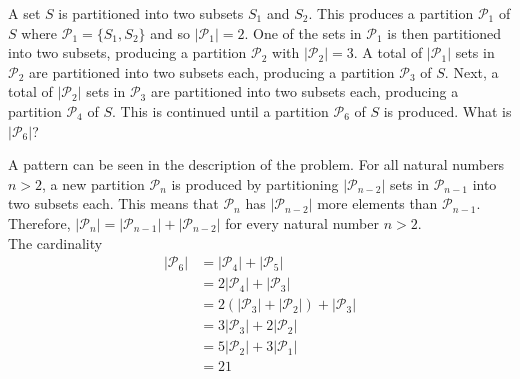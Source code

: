 \documentclass[12pt]{article}
\newenvironment{problem}[2][Problem]{\begin{trivlist}
		\item[\hskip \labelsep {\bfseries #1}\hskip \labelsep {\bfseries #2.}]}{\end{trivlist}}
\newenvironment{solution}[2][Solution]{\begin{trivlist}
		\item[\hskip \labelsep {\bfseries #1}\hskip \labelsep {\bfseries #2.}]}{\end{trivlist}}
\begin{document}
\begin{problem}{55}
	A set $S$ is partitioned into two subsets $S_{1}$ and $S_{2}$. This produces a partition $\mathcal{P}_{1}$ of $S$ where $\mathcal{P}_{1} = \{S_{1},S_{2}\}$ and so $|\mathcal{P}_{1}| = 2$. One of the sets in $\mathcal{P}_{1}$ is then partitioned into two subsets, producing a partition $\mathcal{P}_{2}$ with $|\mathcal{P}_{2}|=3$. A total of $|\mathcal{P}_{1}|$ sets in $\mathcal{P}_{2}$ are partitioned into two subsets each, producing a partition $\mathcal{P}_{3}$ of $S$. Next, a total of $|\mathcal{P}_{2}|$ sets in $\mathcal{P}_{3}$ are partitioned into two subsets each, producing a partition $\mathcal{P}_{4}$ of $S$. This is continued until a partition $\mathcal{P}_{6}$ of $S$ is produced. What is $|\mathcal{P}_{6}|$?
	\begin{solution}{}
		A pattern can be seen in the description of the problem.  For all natural numbers $n>2$, a new partition $\mathcal{P}_{n}$ is produced by partitioning $|\mathcal{P}_{n-2}|$ sets in $\mathcal{P}_{n-1}$ into two subsets each. This means that $\mathcal{P}_{n}$ has $|\mathcal{P}_{n-2}|$ more elements than $\mathcal{P}_{n-1}$.
		Therefore,  $|\mathcal{P}_{n}| = |\mathcal{P}_{n-1}|+ |\mathcal{P}_{n-2}|$ for every natural number $n>2$.\\
		The cardinality 
		\begin{align*}
		| \mathcal{P}_{6}|&= |\mathcal{P}_{4}| + |\mathcal{P}_{5}|\\
		&= 2|\mathcal{P}_{4}| + |\mathcal{P}_{3}|\\
		&= 2(|\mathcal{P}_{3}|+|\mathcal{P}_{2}|) + |\mathcal{P}_{3}|\\
		&= 3|\mathcal{P}_{3}| + 2|\mathcal{P}_{2}|\\
		&= 5|\mathcal{P}_{2}| + 3|\mathcal{P}_{1}|\\
		&= 21
	\end{align*}
	\end{solution}
\end{problem}
\end{document}
